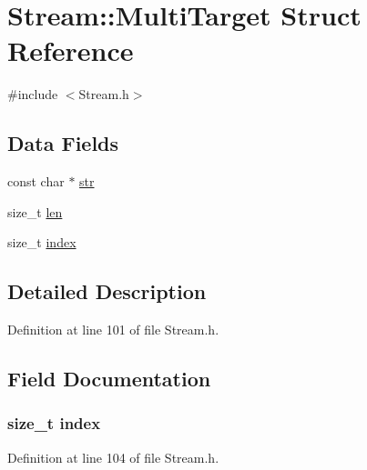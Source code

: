 \hypertarget{struct_stream_1_1_multi_target}{}\section{Stream\+:\+:Multi\+Target Struct Reference}
\label{struct_stream_1_1_multi_target}


{\ttfamily \#include $<$Stream.\+h$>$}

\subsection*{Data Fields}
\begin{DoxyCompactItemize}
\item 
const char $\ast$ \hyperlink{struct_stream_1_1_multi_target_af25d6dc49269fa2003ac7c7fa6f13915}{str}
\item 
size\+\_\+t \hyperlink{struct_stream_1_1_multi_target_a7360b55975153b822efc5217b7734e6a}{len}
\item 
size\+\_\+t \hyperlink{struct_stream_1_1_multi_target_a3f42f10d93f6edb91d7d3f6edad25921}{index}
\end{DoxyCompactItemize}


\subsection{Detailed Description}


Definition at line 101 of file Stream.\+h.



\subsection{Field Documentation}
\hypertarget{struct_stream_1_1_multi_target_a3f42f10d93f6edb91d7d3f6edad25921}{}
\subsubsection[{index}]{\setlength{\rightskip}{0pt plus 5cm}size\+\_\+t index}\label{struct_stream_1_1_multi_target_a3f42f10d93f6edb91d7d3f6edad25921}


Definition at line 104 of file Stream.\+h.

\hypertarget{struct_stream_1_1_multi_target_a7360b55975153b822efc5217b7734e6a}{}
